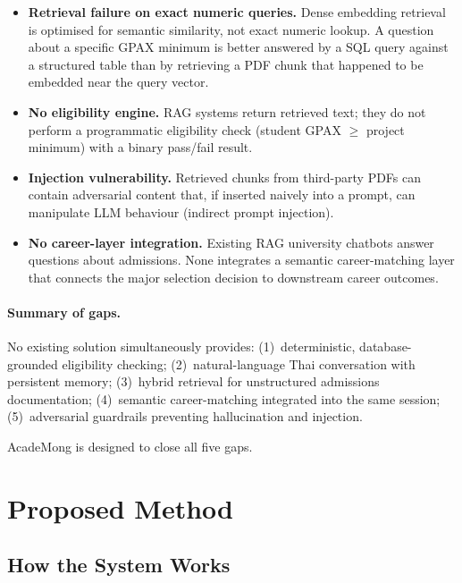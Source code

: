 ﻿\documentclass[12pt,a4paper]{article}
\begin{document}
\begin{itemize}[leftmargin=2em]
    \item \textbf{Retrieval failure on exact numeric queries.} Dense embedding retrieval
    is optimised for semantic similarity, not exact numeric lookup. A question about
    a specific GPAX minimum is better answered by a SQL query against a structured
    table than by retrieving a PDF chunk that happened to be embedded near the query
    vector.
    \item \textbf{No eligibility engine.} RAG systems return retrieved text; they do
    not perform a programmatic eligibility check (student GPAX $\geq$ project
    minimum) with a binary pass/fail result.
    \item \textbf{Injection vulnerability.} Retrieved chunks from third-party PDFs
    can contain adversarial content that, if inserted naively into a prompt, can
    manipulate LLM behaviour (indirect prompt injection).
    \item \textbf{No career-layer integration.} Existing RAG university chatbots
    answer questions about admissions. None integrates a semantic career-matching
    layer that connects the major selection decision to downstream career outcomes.
\end{itemize}

\paragraph{Summary of gaps.} No existing solution simultaneously provides:
(1)~deterministic, database-grounded eligibility checking;
(2)~natural-language Thai conversation with persistent memory;
(3)~hybrid retrieval for unstructured admissions documentation;
(4)~semantic career-matching integrated into the same session;
(5)~adversarial guardrails preventing hallucination and injection.

AcadeMong is designed to close all five gaps.

\section{Proposed Method}

\subsection{How the System Works}
\end{document}
